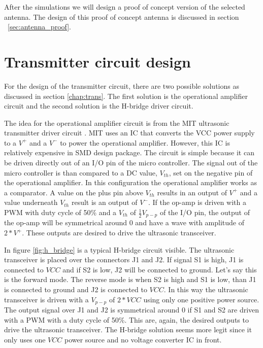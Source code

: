 After the simulations we will design a proof of concept version of the selected antenna.
The design of this proof of concept antenna is discussed in section ~\ref{sec:antenna_proof}.

\section{Transmitter circuit design}
\label{sec:transcircuit}

For the design of the transmitter circuit, there are two possible solutions as discussed in section \ref{chap:trans}. The first solution is the operational amplifier circuit and the second solution is the H-bridge driver circuit.

The idea for the operational amplifier circuit is from the MIT ultrasonic transmitter driver circuit \cite{Priyantha2005}. MIT uses an IC that converts the VCC power supply to a $V^{+}$ and a $V^{-}$ to power the operational amplifier. However, this IC is relatively expensive in SMD design package. The circuit is simple because it can be driven directly out of an I/O pin of the micro controller. The signal out of the micro controller is than compared to a DC value, $V_{th}$, set on the negative pin of the operational amplifier. In this configuration the operational amplifier works as a comparator. A value on the plus pin above $V_{th}$ results in an output of $V^{+}$ and a value underneath $V_{th}$ result is an output of $V^{-}$. If the op-amp is driven with a PWM with duty cycle of 50\% and a $V_{th}$ of $\frac{1}{2}V_{p-p}$ of the I/O pin, the output of the op-amp will be symmetrical around 0 and have a wave with amplitude of $2 * V^{+}$. These outputs are desired to drive the ultrasonic transceiver.

In figure \ref{fig:h_bridge} is a typical H-bridge circuit visible. The ultrasonic transceiver is placed over the connectors J1 and J2. If signal S1 is high, J1 is connected to $VCC$ and if S2 is low, J2 will be connected to ground. Let's say this is the forward mode. The reverse mode is when S2 is high and S1 is low, than J1 is connected to ground and J2 is connected to $VCC$. In this way the ultrasonic transceiver is driven with a $V_{p-p}$ of $2 * VCC$ using only one positive power source. The output signal over J1 and J2 is symmetrical around 0 if S1 and S2 are driven with a PWM with a duty cycle of 50\%. This are, again, the desired outputs to drive the ultrasonic transceiver. The H-bridge solution seems more legit since it only uses one $VCC$ power source and no voltage converter IC in front.

